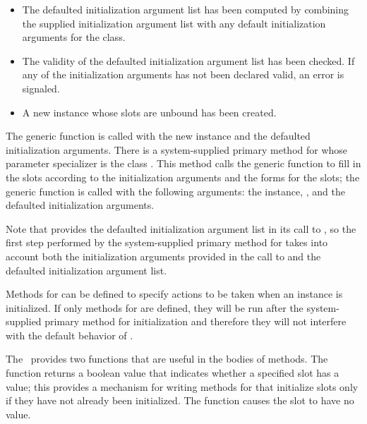 \begin{itemize} 

\item The defaulted initialization argument list has been computed by
combining the supplied initialization argument list with any default
initialization arguments for the class.

\item The validity of the defaulted initialization argument
list has been checked.  If any of the initialization arguments has not
been declared valid, an error is signaled.

\item A new instance whose slots are unbound has been created.

\end{itemize}

The generic function  is called with the
new instance and the defaulted initialization arguments.  There is
a system-supplied primary method for 
whose parameter specializer is the class .  This
method calls the generic function  to fill in
the slots according to the initialization arguments and the 
 forms for the slots; the generic function 
 is called with the following arguments: the instance,
, and the defaulted initialization arguments.

Note that  provides the defaulted
initialization argument list in its call to ,
so the first step performed by the system-supplied primary method for
 takes into account both the initialization
arguments provided in the call to  and the
defaulted initialization argument list.

Methods for  can be defined to specify
actions to be taken when an instance is initialized.  If only 
methods for  are defined, they will be
run after the system-supplied primary method for initialization and
therefore they will not interfere with the default behavior of 
.

The \OS\ provides two functions that are useful in the bodies of 
 methods.  The function 
returns a boolean value that indicates whether a specified slot has a
value; this provides a mechanism for writing  methods for
 that initialize slots only if they have
not already been initialized.  The function 
causes the slot to have no value.

